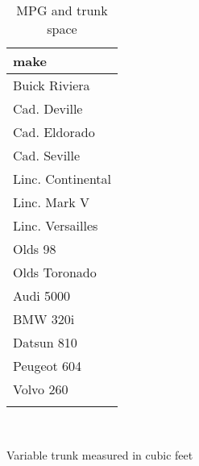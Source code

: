 \documentclass{article}
\begin{document}
\begin{table}[tbp] \centering
{}

\caption{MPG and trunk space}
\begin{tabularx}{0.4\linewidth}{@{}l@{}}

\toprule
{make} \tabularnewline
\midrule \addlinespace[\belowrulesep]
Buick Riviera \tabularnewline
Cad. Deville \tabularnewline
Cad. Eldorado \tabularnewline
Cad. Seville \tabularnewline
Linc. Continental \tabularnewline
Linc. Mark V \tabularnewline
Linc. Versailles \tabularnewline
Olds 98 \tabularnewline
Olds Toronado \tabularnewline
Audi 5000 \tabularnewline
BMW 320i \tabularnewline
Datsun 810 \tabularnewline
Peugeot 604 \tabularnewline
Volvo 260 \tabularnewline
\bottomrule \addlinespace[\belowrulesep]

\end{tabularx}
\\ \parbox{0.4\linewidth}{\footnotesize Variable trunk measured in cubic feet}
\end{table}
\end{document}
